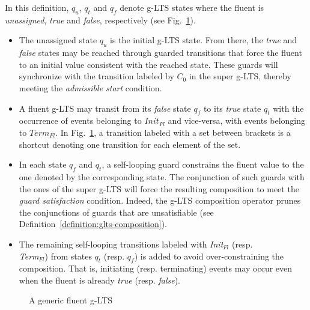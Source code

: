 In this definition, $q_u$, $q_t$ and $q_f$ denote g-LTS states where the fluent is \emph{unassigned}, \emph{true} and \emph{false}, respectively (see Fig.~\ref{image:fluent-glts}).
\begin{itemize}
\item The unassigned state $q_u$ is the initial g-LTS state. From there, the \emph{true} and \emph{false} states may be reached through guarded transitions that force the fluent to an initial value consistent with the reached state. These guards will synchronize with the transition labeled by $C_0$ in the super g-LTS, thereby meeting the \emph{admissible start} condition.
\item A fluent g-LTS may transit from its \emph{false} state $q_f$ to its \emph{true} state $q_t$ with the occurrence of events belonging to $Init_{Fl}$ and vice-versa, with events belonging to $Term_{Fl}$. In Fig.~\ref{image:fluent-glts}, a transition labeled with a set between brackets is a shortcut denoting one transition for each element of the set.
\item In each state $q_f$ and $q_t$, a self-looping guard constrains the fluent value to the one denoted by the corresponding state. The conjunction of such guards with the ones of the super g-LTS will force the resulting composition to meet the \emph{guard satisfaction} condition. Indeed, the g-LTS composition operator prunes the conjunctions of guards that are unsatisfiable (see Definition~\ref{definition:glts-composition}).
\item The remaining self-looping transitions labeled with \emph{Init$_{Fl}$} (resp. \\ \emph{Term$_{Fl}$}) from states $q_t$ (resp. $q_f$) is added to avoid over-constraining the composition. That is, initiating (resp. terminating) events may occur even when the fluent is already \emph{true} (resp. \emph{false}).
\end{itemize}

\begin{figure}\centering
{}
\caption{A generic fluent g-LTS\label{image:fluent-glts}}
\end{figure}

